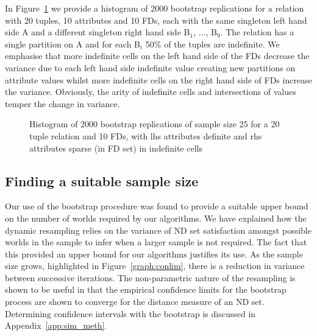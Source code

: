 \smallskip

In Figure~\ref{graph:cp_hist1} we provide a histogram of
2000 bootstrap replications for a relation with 20 tuples, 
10 attributes and 10 FDs, each with the same singleton left hand side A
and a different singleton right hand side B$_1$, $\ldots$, B$_9$.
The relation has a single partition on A and for each B$_i$ 50\% of
the tuples are indefinite.
We emphasise that more indefinite cells on the left hand side of the
FDs decrease the variance due to each left hand side indefinite value creating
new partitions on attribute values whilst more indefinite cells
on the right hand side of FDs increase the variance. Obviously, the arity of
indefinite cells and intersections of values temper the change in
variance. 


\begin{figure}
\centerline{}
\caption{\label{graph:cp_hist1} {Histogram of 2000 bootstrap
replications of sample size 25 for a 20 tuple relation and 10 FDs,
with lhs attributes definite and rhs attributes sparse (in FD set) in
indefinite cells}} 
\end{figure}


\subsection{Finding a suitable sample size}

Our use of the bootstrap procedure was found to provide a suitable
upper bound on the number of worlds required by our algorithms. We
have explained how the dynamic resampling relies on the variance of ND
set satisfaction amongst possible worlds in the sample to infer when a
larger sample is not required.  The fact that this provided an upper
bound for our algorithms justifies its use. 
As the sample size grows, highlighted in
Figure~\ref{graph:conlim}, there is a reduction in variance between
successive iterations. The non-parametric nature of the resampling is
shown to be useful in that the empirical confidence limits for
the bootstrap process are
shown to converge for the distance measure of an ND set. Determining
confidence intervals with the bootstrap is discussed in Appendix~\ref{app:sim_meth}.


